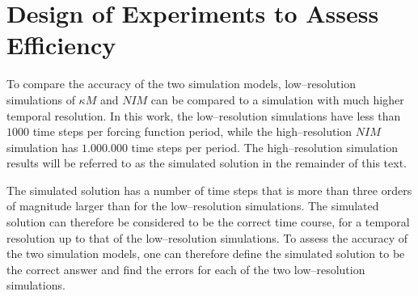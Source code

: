 
\section{Design of Experiments to Assess Efficiency}






	To compare the accuracy of the two simulation models, low--resolution simulations of $\kappa M$ and $NIM$ can be compared to a simulation with much higher temporal resolution. %
	In this work, the low--resolution simulations have less than $1000$ time steps per forcing function period, while the high--resolution $NIM$ simulation has $1.000.000$ time steps per period.
 	The high--resolution simulation results will be referred to as the simulated solution in the remainder of this text. %

	The simulated solution has a number of time steps that is more than three orders of magnitude larger than for the low--resolution simulations.
	The simulated solution can therefore be considered to be the correct time course, for a temporal resolution up to that of the low--resolution simulations.
	To assess the accuracy of the two simulation models, one can therefore define the simulated solution to be the correct answer and find the errors for each of the two low--resolution simulations.


